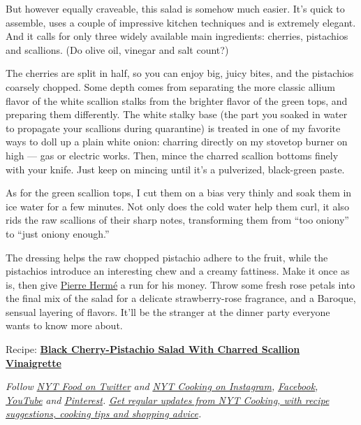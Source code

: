 But however equally craveable, this salad is somehow much easier. It's
quick to assemble, uses a couple of impressive kitchen techniques and is
extremely elegant. And it calls for only three widely available main
ingredients: cherries, pistachios and scallions. (Do olive oil, vinegar
and salt count?)

The cherries are split in half, so you can enjoy big, juicy bites, and
the pistachios coarsely chopped. Some depth comes from separating the
more classic allium flavor of the white scallion stalks from the
brighter flavor of the green tops, and preparing them differently. The
white stalky base (the part you soaked in water to propagate your
scallions during quarantine) is treated in one of my favorite ways to
doll up a plain white onion: charring directly on my stovetop burner on
high --- gas or electric works. Then, mince the charred scallion bottoms
finely with your knife. Just keep on mincing until it's a pulverized,
black-green paste.

As for the green scallion tops, I cut them on a bias very thinly and
soak them in ice water for a few minutes. Not only does the cold water
help them curl, it also rids the raw scallions of their sharp notes,
transforming them from ``too oniony'' to ``just oniony enough.''

The dressing helps the raw chopped pistachio adhere to the fruit, while
the pistachios introduce an interesting chew and a creamy fattiness.
Make it once as is, then give
\href{https://www.nytimes.com/2017/08/11/magazine/elevating-the-humble-cookie.html}{Pierre
Hermé} a run for his money. Throw some fresh rose petals into the final
mix of the salad for a delicate strawberry-rose fragrance, and a
Baroque, sensual layering of flavors. It'll be the stranger at the
dinner party everyone wants to know more about.

Recipe:
\textbf{\href{https://cooking.nytimes.com/recipes/1021253-black-cherry-pistachio-salad-with-charred-scallion-vinaigrette}{Black
Cherry-Pistachio Salad With Charred Scallion Vinaigrette}}

\emph{Follow} \href{https://twitter.com/nytfood}{\emph{NYT Food on
Twitter}} \emph{and}
\href{https://www.instagram.com/nytcooking/}{\emph{NYT Cooking on
Instagram}}\emph{,}
\href{https://www.facebook.com/nytcooking/}{\emph{Facebook}}\emph{,}
\href{https://www.youtube.com/nytcooking}{\emph{YouTube}} \emph{and}
\href{https://www.pinterest.com/nytcooking/}{\emph{Pinterest}}\emph{.}
\href{https://www.nytimes.com/newsletters/cooking}{\emph{Get regular
updates from NYT Cooking, with recipe suggestions, cooking tips and
shopping advice}}\emph{.}

